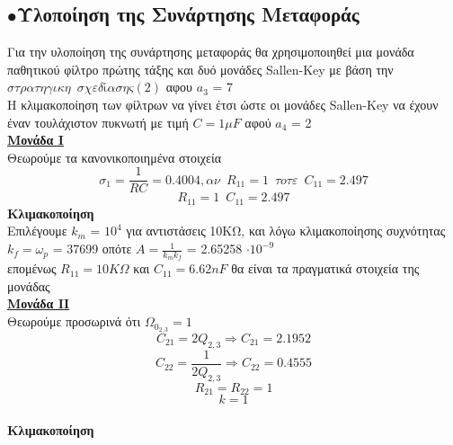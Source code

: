 \documentclass{article}
\begin{document}
  \subsection*{$\bullet$Υλοποίηση της Συνάρτησης Μεταφοράς}
 
Για την υλοποίηση της συνάρτησης μεταφοράς θα χρησιμοποιηθεί μια μονάδα παθητικού φίλτρο πρώτης τάξης και δυό μονάδες Sallen-Key με βάση την $\boxed{στρατηγικη \enspace σχεδίασης (2)}$ αφου $a_3$ = 7 \\ 
Η κλιμακοποίηση των φίλτρων να γίνει έτσι ώστε οι μονάδες
Sallen-Key
να έχουν έναν τουλάχιστον πυκνωτή με τιμή $\boxed{C = 1μF}$ αφού $a_4$ = 2
\\[0.4\baselineskip]
\large{ \underline{\textbf{Μονάδα Ι}} \\[0.4\baselineskip]}
\large{}
Θεωρούμε τα κανονικοποιημένα στοιχεία
\begin{equation*}
σ_1 = \frac{1}{RC} = 0.4004, αν \enspace R_{11} = 1 \enspace τοτε \enspace C_{11} = 2.497
\end{equation*}
\begin{equation*}
\boxed{ R_{11} = 1} \enspace \boxed{C_{11} = 2.497}
\end{equation*}
\large{ {\textbf{Κλιμακοποίηση}} \\[0.4\baselineskip]}
\large{}
Eπιλέγουμε $k_m$ = $10^4$ για αντιστάσεις 10KΩ, και λόγω κλιμακοποίησης συχνότητας $k_f=ω_p$ = 37699 οπότε $Α = \frac{1}{k_m k_f}$ = 2.65258 $\cdot 10^{-9}$  \\
επομένως $\boxed{R_{11} = 10KΩ}$ και $\boxed{C_{11} = 6.62nF}$ θα είναι τα πραγματικά στοιχεία της μονάδας
\\[0.4\baselineskip]
\large{ \underline{\textbf{Μονάδα ΙI}} \\[0.4\baselineskip]}
\large{}
Θεωρούμε προσωρινά ότι $Ω_{0_{2,3}} = 1$
\begin{equation*}
C_{21} = 2Q_{2,3} \Rightarrow \boxed{C_{21} = 2.1952}
\end{equation*}
\begin{equation*}
C_{22} = \frac{1}{2Q_{2,3}} \Rightarrow \boxed{C_{22} = 0.4555}
\end{equation*}
\begin{equation*}
R_{21} = R_{22} = 1 
\end{equation*}
\begin{equation*}
k=1
\end{equation*}
\\[0.4\baselineskip]
\large{ {\textbf{Κλιμακοποίηση}} \\[0.4\baselineskip]}
\end{document}
